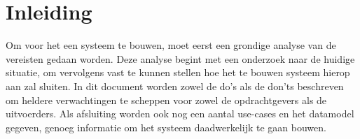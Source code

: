\section{Inleiding}
\label{inleiding}

Om voor het \casamproject een systeem te bouwen,
moet eerst een grondige analyse van de vereisten gedaan worden.
Deze analyse begint met een onderzoek naar de huidige situatie,
om vervolgens vast te kunnen stellen hoe het te bouwen systeem hierop aan zal sluiten.
In dit document worden zowel de do's als de don'ts beschreven om heldere verwachtingen te scheppen
voor zowel de opdrachtgevers als de uitvoerders.
Als afsluiting worden ook nog een aantal use-cases en het datamodel gegeven,
genoeg informatie om het systeem daadwerkelijk te gaan bouwen.
